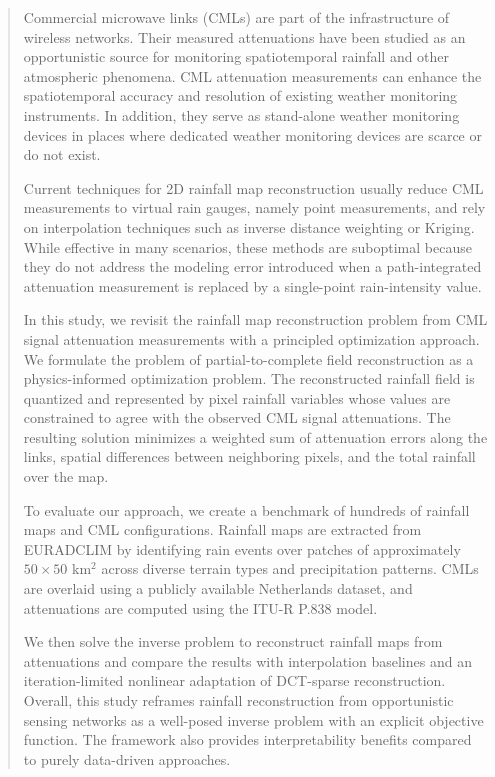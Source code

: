 \documentclass[a4paper,fleqn]{cas-sc}
\begin{document}
\begin{abstract}
  Commercial microwave links (CMLs) are part of the infrastructure of wireless networks. Their measured attenuations have been studied as an opportunistic source for monitoring spatiotemporal rainfall and other atmospheric phenomena. CML attenuation measurements can enhance the spatiotemporal accuracy and resolution of existing weather monitoring instruments. In addition, they serve as stand-alone weather monitoring devices in places where dedicated weather monitoring devices are scarce or do not exist.

  Current techniques for 2D rainfall map reconstruction usually reduce CML measurements to virtual rain gauges, namely point measurements, and rely on interpolation techniques such as inverse distance weighting or Kriging. While effective in many scenarios, these methods are suboptimal because they do not address the modeling error introduced when a path-integrated attenuation measurement is replaced by a single-point rain-intensity value.

  In this study, we revisit the rainfall map reconstruction problem from CML signal attenuation measurements with a principled optimization approach. We formulate the problem of partial-to-complete field reconstruction as a physics-informed optimization problem. The reconstructed rainfall field is quantized and represented by pixel rainfall variables whose values are constrained to agree with the observed CML signal attenuations. The resulting solution minimizes a weighted sum of attenuation errors along the links, spatial differences between neighboring pixels, and the total rainfall over the map.

  To evaluate our approach, we create a benchmark of hundreds of rainfall maps and CML configurations. Rainfall maps are extracted from EURADCLIM by identifying rain events over patches of approximately $50 \times 50$ km$^2$ across diverse terrain types and precipitation patterns. CMLs are overlaid using a publicly available Netherlands dataset, and attenuations are computed using the ITU-R P.838 model.

  We then solve the inverse problem to reconstruct rainfall maps from attenuations and compare the results with interpolation baselines and an iteration-limited nonlinear adaptation of DCT-sparse reconstruction. Overall, this study reframes rainfall reconstruction from opportunistic sensing networks as a well-posed inverse problem with an explicit objective function. The framework also provides interpretability benefits compared to purely data-driven approaches.
\end{abstract}
\end{document}
